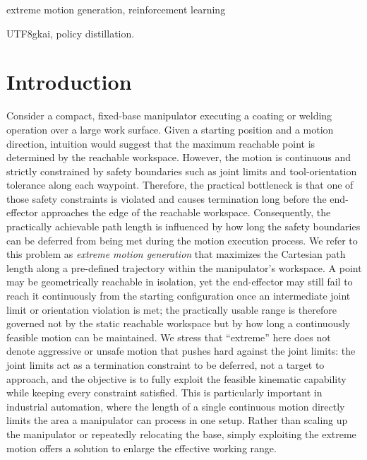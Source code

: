 \documentclass[journal, twoside]{IEEEtran}
\newcommand{\xinyi}[1]{{\color{darkorange}\begin{CJK*}{UTF8}{gkai}#1\end{CJK*}}}
\newcommand{\rst}[1]{{\color{rstcolor}#1}}
\begin{document}
\begin{IEEEkeywords}
extreme motion generation, reinforcement learning\xinyi{, policy distillation.}
\end{IEEEkeywords}

\section{Introduction}
Consider a compact, fixed-base manipulator executing a coating or welding operation over a large work surface. Given a starting position and a motion direction, intuition would suggest that the maximum reachable point is determined by the reachable workspace. However, the motion is continuous and strictly constrained by safety boundaries such as joint limits and tool-orientation tolerance along each waypoint. Therefore, the practical bottleneck is that one of those safety constraints is violated and causes termination long before the end-effector approaches the edge of the reachable workspace. Consequently, the practically achievable path length is influenced by how long the safety boundaries can be deferred from being met during the motion execution process. We refer to this problem as \textit{extreme motion generation} that maximizes the Cartesian path length along a pre-defined trajectory within the manipulator's workspace. \rst{A point may be geometrically reachable in isolation, yet the end-effector may still fail to reach it continuously from the starting configuration once an intermediate joint limit or orientation violation is met; the practically usable range is therefore governed not by the static reachable workspace but by how long a continuously feasible motion can be maintained. We stress that ``extreme'' here does not denote aggressive or unsafe motion that pushes hard against the joint limits: the joint limits act as a termination constraint to be deferred, not a target to approach, and the objective is to fully exploit the feasible kinematic capability while keeping every constraint satisfied.} This is particularly important in industrial automation, where the length of a single continuous motion directly limits the area a manipulator can process in one setup. Rather than scaling up the manipulator or repeatedly relocating the base, simply exploiting the extreme motion offers a solution to enlarge the effective working range.
\end{document}
